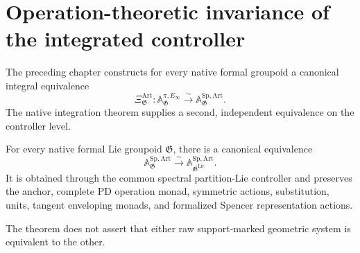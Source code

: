 \section{Operation-theoretic invariance of the integrated controller}
\label{sec:bnli-operation-characterization}

The preceding chapter constructs for every native formal groupoid a canonical
integral equivalence
\[
    \Xi^{\mathrm{Art}}_{\mathfrak G}:
    \mathbb A^{\pi,E_\infty}_{\mathfrak G}
    \xrightarrow{\sim}
    \mathbb A^{\mathrm{Sp,Art}}_{\mathfrak G}.
\]
The native integration theorem supplies a second, independent equivalence on
the controller level.

\begin{theorem}
\label{thm:bnli-spencer-invariance}
For every native formal Lie groupoid \(\mathfrak G\), there is a canonical
equivalence
\[
\boxed{
    \mathbb A^{\mathrm{Sp,Art}}_{\mathfrak G}
    \xrightarrow{\sim}
    \mathbb A^{\mathrm{Sp,Art}}_{\mathfrak G^{\mathrm{Lie}}}.}
\]
It is obtained through the common spectral partition-Lie controller and
preserves the anchor, complete PD operation monad, symmetric actions,
substitution, units, tangent enveloping monads, and formalized Spencer
representation actions.

The theorem does not assert that either raw support-marked geometric system is
equivalent to the other.
\end{theorem}

